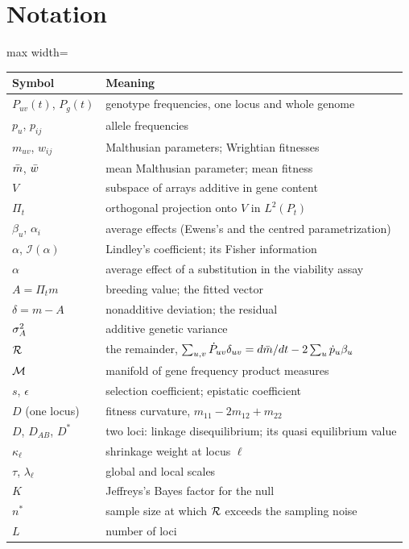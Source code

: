\section{Notation}
\label{ftns:app:notation}

\begin{center}
\begin{adjustbox}{max width=\textwidth}
\begin{tabular}{ll}
\toprule
Symbol & Meaning \\
\midrule
$P_{uv}(t)$, $P_g(t)$ & genotype frequencies, one locus and whole genome \\
$p_u$, $p_{ij}$ & allele frequencies \\
$m_{uv}$, $w_{ij}$ & Malthusian parameters; Wrightian fitnesses \\
$\bar{m}$, $\bar{w}$ & mean Malthusian parameter; mean fitness \\
$V$ & subspace of arrays additive in gene content \\
$\Pi_t$ & orthogonal projection onto $V$ in $L^2(P_t)$ \\
$\beta_u$, $\alpha_i$ & average effects (Ewens's and the centred parametrization) \\
$\alpha$, $\mathcal{I}(\alpha)$ & Lindley's coefficient; its Fisher information \\
$\alpha$ & average effect of a substitution in the viability assay \\
$A=\Pi_tm$ & breeding value; the fitted vector \\
$\delta=m-A$ & nonadditive deviation; the residual \\
$\sigma^{2}_{A}$ & additive genetic variance \\
$\mathcal{R}$ & the remainder, $\sum_{u,v}\dot P_{uv}\delta_{uv}=d\bar{m}/dt-2\sum_u\dot p_u\beta_u$ \\
$\mathcal{M}$ & manifold of gene frequency product measures \\
$s$, $\epsilon$ & selection coefficient; epistatic coefficient \\
$D$ (one locus) & fitness curvature, $m_{11}-2m_{12}+m_{22}$ \\
$D$, $D_{AB}$, $D^\ast$ & two loci: linkage disequilibrium; its quasi equilibrium value \\
$\kappa_\ell$ & shrinkage weight at locus $\ell$ \\
$\tau$, $\lambda_\ell$ & global and local scales \\
$K$ & Jeffreys's Bayes factor for the null \\
$n^\ast$ & sample size at which $\mathcal{R}$ exceeds the sampling noise \\
$L$ & number of loci \\
\bottomrule
\end{tabular}
\end{adjustbox}
\end{center}

